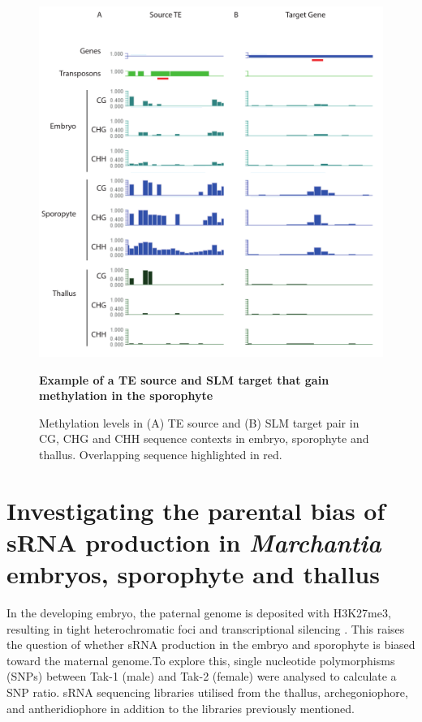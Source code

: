 \begin{figure}[htbp!] 
\centering    
    \includegraphics[width=1\textwidth]{Chapter3/Figs/Figure6_pairs_examples.pdf}
\caption{\textbf{Example of a TE  source and SLM target that gain methylation in the sporophyte}}
\label{fig:TE_SLM_pairs}
\captionsetup{font=small}
    \caption*{Methylation levels in (A) TE source and (B) SLM target pair in CG, CHG and CHH sequence contexts in embryo, sporophyte and thallus. Overlapping sequence highlighted in red.}
\end{figure}

\section{Investigating the parental bias of sRNA production in \textit{Marchantia} embryos, sporophyte and thallus}

In the developing embryo, the paternal genome is deposited with H3K27me3, resulting in tight heterochromatic foci and transcriptional silencing \cite{RN160}. This raises the question of whether sRNA production in the embryo and sporophyte is biased toward the maternal genome.To explore this, single nucleotide polymorphisms (SNPs) between Tak-1 (male) and Tak-2 (female) were analysed to calculate a SNP ratio. sRNA sequencing libraries utilised from the thallus, archegoniophore, and antheridiophore \cite{RN265} in addition to the libraries previously mentioned.

